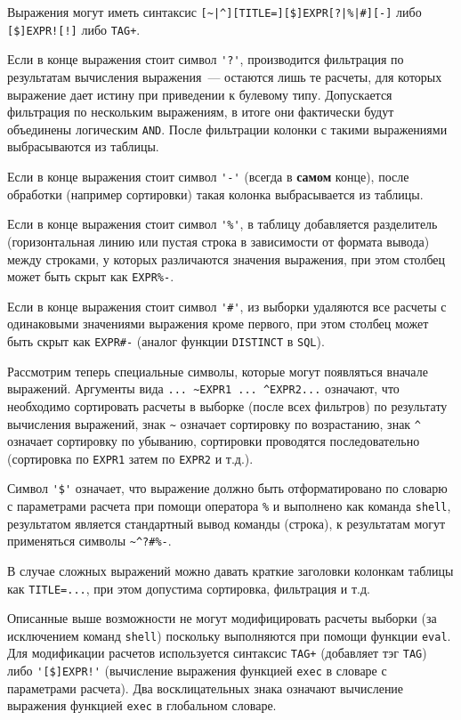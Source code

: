 Выражения могут иметь синтаксис \verb'[~|^][TITLE=][$]EXPR[?|%|#][-]' либо \verb'[$]EXPR![!]' либо \verb'TAG+'.

Если в конце выражения стоит символ \verb|'?'|, производится фильтрация по результатам вычисления выражения~--- остаются лишь те расчеты,
для которых выражение дает истину при приведении к булевому типу. Допускается фильтрация по нескольким выражениям, в итоге они фактически
будут объединены логическим \verb'AND'. После фильтрации колонки с такими выражениями выбрасываются из таблицы.

Если в конце выражения стоит символ \verb|'-'| (всегда в {\bf самом} конце), после обработки (например сортировки) такая колонка выбрасывается из таблицы. 

Если в конце выражения стоит символ \verb|'%'|, в таблицу добавляется разделитель (горизонтальная линию или пустая строка в зависимости от формата вывода)
между строками, у которых различаются значения выражения, при этом столбец может быть скрыт как \verb'EXPR%-'.

Если в конце выражения стоит символ \verb|'#'|, из выборки удаляются все расчеты с одинаковыми значениями выражения кроме первого,
при этом столбец может быть скрыт как \verb'EXPR#-' (аналог функции \verb'DISTINCT' в \verb'SQL').

Рассмотрим теперь специальные символы, которые могут появляться вначале выражений.
Аргументы вида \verb'... ~EXPR1 ... ^EXPR2...' означают,
что необходимо сортировать расчеты  в выборке (после всех фильтров) по результату вычисления выражений, знак \verb'~' означает
сортировку по возрастанию, знак \verb'^' означает сортировку по убыванию, сортировки проводятся последовательно
(сортировка по \verb'EXPR1' затем по \verb'EXPR2' и т.д.).

Символ \verb|'$'| означает, что 
выражение должно быть отформатировано по словарю с параметрами расчета при помощи оператора \verb'%' и выполнено как команда \verb'shell',
результатом является стандартный вывод команды (строка), к результатам
могут применяться символы \verb'~^?#%-'.

В случае сложных выражений можно давать краткие заголовки колонкам таблицы как \verb'TITLE=...', при этом допустима сортировка, фильтрация и т.д.

Описанные выше возможности не могут модифицировать расчеты выборки (за исключением команд \verb'shell') поскольку выполняются при помощи функции \verb'eval'.
Для модификации расчетов используется синтаксис \verb'TAG+' (добавляет тэг \verb'TAG') либо  \verb|'[$]EXPR!'| (вычисление выражения функцией \verb'exec'
в словаре с параметрами расчета). Два восклицательных знака означают вычисление выражения функцией \verb'exec'
в глобальном словаре.

